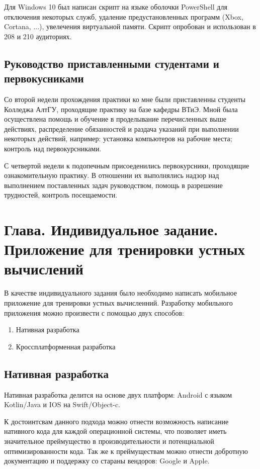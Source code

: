 \documentclass[14pt, oneside]{altsu-report}
\begin{document}
Для Windows 10 был написан скрипт на языке оболочки PowerShell для отключения некоторых служб, удаление предустановленных программ (Xbox, Cortana, ...), увелечения виртуальной памяти. Скрипт опробован и использован в 208 и 210 аудиториях.

\section{Руководство приставленными студентами и первокусниками}
Со второй недели прохождения практики ко мне были приставленны студенты Колледжа АлтГУ, проходящие практику на базе кафедры ВТиЭ. Мной была осуществлена помощь и обучение в проделывание перечисленных выше действиях, распределение обязанностей и раздача указаний при выполнении некоторых действий, например: установка компьютеров на рабочие места; контроль над первокурсниками.

С четвертой недели к подопечным присоеденились первокурсники, проходящие ознакомительную практику. В отношении их выполнялись надзор над выполнением поставленных задач руководством, помощь в разрешение трудностей, контроль посещаемости.

\chapter{Глава. Индивидуальное задание. Приложение для тренировки устных вычислений}
В качестве индивидуального задания было необходимо написать мобильное приложение для тренировки устных вычисленний. 
Разработку мобильного приложения можно произвести с помощью двух способов:
\begin{enumerate}
  \item Нативная разработка
  \item Кроссплатформенная разработка
\end{enumerate}
\section*{Нативная разработка}
Нативная разработка делится на основе двух платформ: Android с языком Kotlin/Java и IOS на Swift/Object-c.

К достоинтсвам данного подхода можно отнести возможность написание нативного кода для каждой операционной системы, что позволяет иметь значительное преймущество в производительности и потенциальной оптимизированности кода. Так же к преймуществам можно отнести добротную документацию и поддержку со стараны вендоров: Google и Apple.
\end{document}
